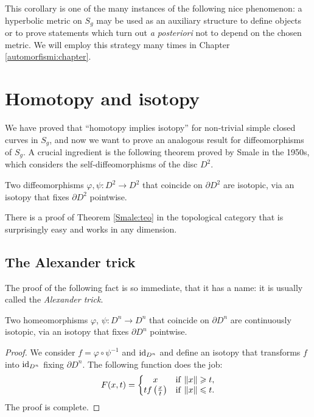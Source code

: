 This corollary is one of the many instances of the following nice phenomenon: a hyperbolic metric on $S_g$ may be used as an auxiliary structure to define objects or to prove statements which turn out \emph{a posteriori} not to depend on the chosen metric. We will employ this strategy many times in Chapter \ref{automorfismi:chapter}.

\section{Homotopy and isotopy}
We have proved that ``homotopy implies isotopy'' for non-trivial simple closed curves in $S_g$, and now we want to prove an analogous result for diffeomorphisms of $S_g$.
A crucial ingredient is the following theorem proved by Smale in the 1950s, which considers the self-diffeomorphisms of the disc $D^2$.

\begin{teo} \label{Smale:teo}
Two diffeomorphisms $\varphi, \psi\colon D^2 \to D^2$ that coincide on $\partial D^2$ are isotopic, via an isotopy that fixes $\partial D^2$ pointwise.
\end{teo}

There is a proof of Theorem \ref{Smale:teo} in the topological category that is surprisingly easy and works in any dimension. %

\subsection{The Alexander trick} \label{Alexander:subsection}
The proof of the following fact is so immediate, that it has a name: it is usually called the \emph{Alexander trick}.

\begin{prop} Two homeomorphisms $\varphi$, $\psi\colon D^n \to D^n$ that coincide on $\partial D^n$ are continuously isotopic, via an isotopy that fixes $\partial D^n$ pointwise.
\end{prop}
\begin{proof}
We consider $f=\varphi\circ \psi^{-1}$ and ${\rm id}_{D^n}$ and define an isotopy that transforms $f$ into ${\rm id}_{D^n}$ fixing $\partial D^n$. The following function does the job:
$$F(x,t) = \left\{ \begin{matrix} x & {\rm if \ } \|x\| \geqslant t, \\ t f\left(\frac xt \right) & {\rm if\  } \|x\| \leqslant t. \end{matrix} \right.$$
The proof is complete.
\end{proof}

